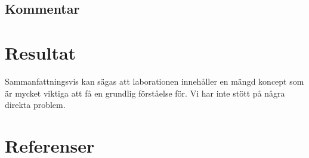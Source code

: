 \documentclass[11pt,a4paper]{article}
\begin{document}
\subsection{Kommentar}\label{}


\section{Resultat}\label{setup}
Sammanfattningsvis kan sägas att laborationen innehåller en mängd koncept som
är mycket viktiga att få en grundlig förståelse för. Vi har inte stött på några
direkta problem.

\newpage

\section{Referenser}\label{refs}




\end{document}
